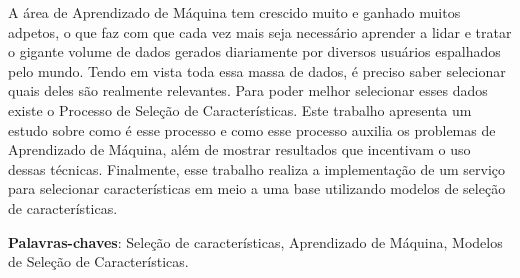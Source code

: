 \begin{resumo}
A área de Aprendizado de Máquina tem crescido muito e ganhado muitos adpetos, o que faz com que cada vez mais seja necessário aprender a lidar e tratar o gigante volume de dados gerados diariamente por diversos usuários espalhados pelo mundo. Tendo em vista toda essa massa de dados, é preciso saber selecionar quais deles são realmente relevantes. Para poder melhor selecionar esses dados existe o Processo de Seleção de Características. Este trabalho apresenta um estudo sobre como é esse processo e como esse processo auxilia os problemas de Aprendizado de Máquina, além de mostrar resultados que incentivam o uso dessas técnicas. Finalmente, esse trabalho realiza a implementação de um serviço para selecionar características em meio a uma base utilizando modelos de seleção de características.

 \vspace{\onelineskip}
    
 \noindent
 \textbf{Palavras-chaves}: Seleção de características, Aprendizado de Máquina, Modelos de 
 Seleção de Características.
\end{resumo}
